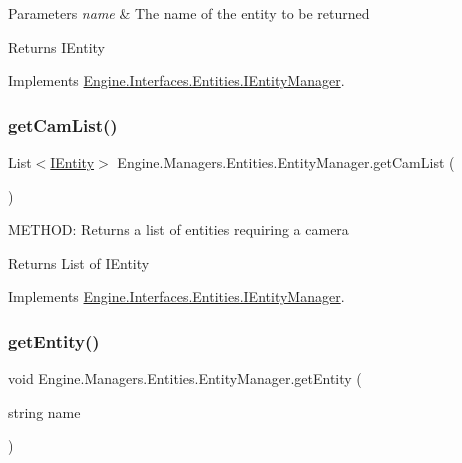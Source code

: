 \begin{DoxyParams}{Parameters}
{\em name} & The name of the entity to be returned\\
\hline
\end{DoxyParams}
\begin{DoxyReturn}{Returns}
I\+Entity
\end{DoxyReturn}


Implements \hyperlink{a00442_aa1098871f43bbd775954aea10a958c0b}{Engine.\+Interfaces.\+Entities.\+I\+Entity\+Manager}.

\mbox{\label{a00518_a13ec76267682ed1ce3ace63c561ec6c5}} 
\subsubsection{\texorpdfstring{get\+Cam\+List()}{getCamList()}}
{\footnotesize\ttfamily List$<$\hyperlink{a00438}{I\+Entity}$>$ Engine.\+Managers.\+Entities.\+Entity\+Manager.\+get\+Cam\+List (\begin{DoxyParamCaption}{ }\end{DoxyParamCaption})\hspace{0.3cm}{\ttfamily [inline]}}



M\+E\+T\+H\+OD\+: Returns a list of entities requiring a camera 

\begin{DoxyReturn}{Returns}
List of I\+Entity
\end{DoxyReturn}


Implements \hyperlink{a00442_a6a6229acffece1f804ba440cf847820d}{Engine.\+Interfaces.\+Entities.\+I\+Entity\+Manager}.

\mbox{\label{a00518_abeffd88412f79249f333944b45486dff}} 
\subsubsection{\texorpdfstring{get\+Entity()}{getEntity()}}
{\footnotesize\ttfamily void Engine.\+Managers.\+Entities.\+Entity\+Manager.\+get\+Entity (\begin{DoxyParamCaption}\item[{string}]{name }\end{DoxyParamCaption})\hspace{0.3cm}{\ttfamily [inline]}}



